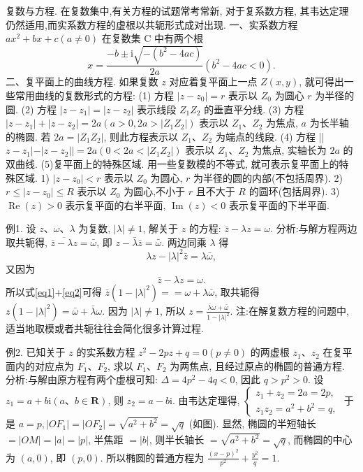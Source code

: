 
复数与方程.
在复数集中,有关方程的试题常考常新, 对于复系数方程, 其韦达定理仍然适用,而实系数方程的虚根以共轭形式成对出现.
一、实系数方程 $a x^2+b x+c(a \neq 0)$ 在复数集 $\mathrm{C}$ 中有两个根
$$
x=\frac{-b \pm \mathrm{i} \sqrt{-\left(b^2-4 a c\right)}}{2 a}\left(b^2-4 a c<0\right) .
$$
二、复平面上的曲线方程.
如果复数 $z$ 对应着复平面上一点 $Z(x, y)$, 就可得出一些常用曲线的复数形式的方程:
(1) 方程 $\left|z-z_0\right|=r$ 表示以 $Z_0$ 为圆心 $r$ 为半径的圆.
(2) 方程 $\left|z-z_1\right|=\left|z-z_2\right|$ 表示线段 $Z_1 Z_2$ 的垂直平分线.
(3) 方程 $\left|z-z_1\right|+\left|z-z_2\right|=2 a\left(a>0,2 a>\left|Z_1 Z_2\right|\right)$ 表示以 $Z_1 、 Z_2$ 为焦点, $a$ 为长半轴的椭圆.
若 $2 a=\left|Z_1 Z_2\right|$, 则此方程表示以 $Z_1 、 Z_2$ 为端点的线段.
(4) 方程 ||$z-z_1|-| z-z_2||=2 a\left(0<2 a<\left|Z_1 Z_2\right|\right)$ 表示以 $Z_1 、 Z_2$ 为焦点, 实轴长为 $2 a$ 的双曲线.
(5)复平面上的特殊区域.
用一些复数模的不等式, 就可表示复平面上的特殊区域.
1) $\left|z-z_0\right|<r$ 表示以 $Z_0$ 为圆心, $r$ 为半径的圆的内部(不包括周界).
2) $r \leqslant\left|z-z_0\right| \leqslant R$ 表示以 $Z_0$ 为圆心,不小于 $r$ 且不大于 $R$ 的圆环(包括周界).
3) $\operatorname{Re}(z)>0$ 表示复平面的右半平面, $\operatorname{Im}(z)<0$ 表示复平面的下半平面.



例1. 设 $z 、 \omega 、 \lambda$ 为复数, $|\lambda| \neq 1$, 解关于 $z$ 的方程: $\bar{z}-\lambda z=\omega$.
分析:与解方程两边取共轭得, $\overline{\bar{z}-\lambda z}=\bar{\omega}$, 即 $z-\bar{\lambda} \bar{z}=\bar{\omega}$. 两边同乘 $\lambda$ 得
$$
\lambda z-|\lambda|^2 \bar{z}=\lambda \bar{\omega}, \label{eq1}
$$
又因为
$$
\bar{z}-\lambda z=\omega . \label{eq2}
$$
所以式\ref{eq1}+\ref{eq2}可得 $\bar{z}\left(1-|\lambda|^2\right)==\omega+\lambda \bar{\omega}$, 取共轭得 $z\left(1-|\lambda|^2\right)=\bar{\omega}+\bar{\lambda} \omega$. 因为 $|\lambda| \neq 1$, 所以 $z=\frac{\bar{\lambda} \omega+\bar{\omega}}{1-|\lambda|^2}$.
注:在解复数方程的问题中, 适当地取模或者共轭往往会简化很多计算过程.



例2. 已知关于 $z$ 的实系数方程 $z^2-2 p z+q=0(p \neq 0)$ 的两虚根 $z_1 、 z_2$ 在复平面内的对应点为 $F_1 、 F_2$, 求以 $F_1 、 F_2$ 为两焦点, 且经过原点的椭圆的普通方程.
分析:与解由原方程有两个虚根可知: $\Delta= 4 p^2-4 q<0$, 因此 $q>p^2>0$.
设 $z_1=a+b \mathrm{i}(a 、 b \in \mathbf{R})$, 则 $z_2=a-b \mathrm{i}$.
由韦达定理得, $\left\{\begin{array}{l}z_1+z_2=2 a=2 p , \\ z_1 z_2=a^2+b^2=q ,\end{array}\right.$
于是 $a=p,\left|O F_1\right|=\left|O F_2\right|=\sqrt{a^2+b^2}= \sqrt{q}$ (如图).
显然, 椭圆的半短轴长 $=|O M|=|a|=|p|$, 半焦距 $=|b|$, 则半长轴长 $=\sqrt{a^2+b^2}=\sqrt{q}$, 而椭圆的中心为 $(a, 0)$, 即 $(p, 0)$.
所以椭圆的普通方程为 $\frac{(x-p)^2}{p^2}+\frac{y^2}{q}=1$.



